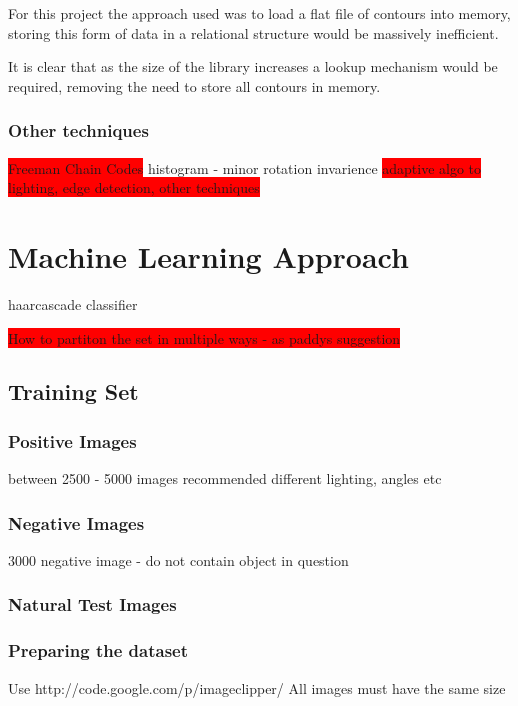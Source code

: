 For this project the approach used was to load a flat file of contours into memory, storing this form of data in a relational structure would be massively inefficient.

It is clear that as the size of the library increases a lookup mechanism would be required, removing the need to store all contours in memory.

\subsubsection{Other techniques}
\colorbox{red}{Freeman Chain Codes} histogram - minor rotation invarience
\colorbox{red}{adaptive algo to lighting, edge detection, other techniques}


\section{Machine Learning Approach}
haarcascade classifier

\colorbox{red}{How to partiton the set in multiple ways - as paddys suggestion}

\subsection{Training Set}

\subsubsection{Positive Images}
between 2500 - 5000 images recommended
different lighting, angles etc

\subsubsection{Negative Images}
3000 negative image - do not contain object in question

\subsubsection{Natural Test Images}

\subsubsection{Preparing the dataset}
Use http://code.google.com/p/imageclipper/ 
All images must have the same size
